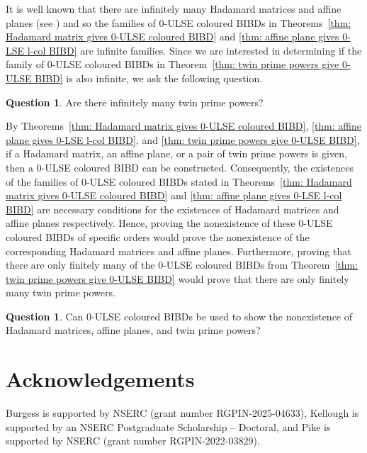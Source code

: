 \documentclass[12pt]{article}
\theoremstyle{definition}
\newtheorem{question}[theorem]{Question}
\begin{document}
It is well known that there are infinitely many Hadamard matrices and affine planes (see \cite{S04}) and so the families of $0$-ULSE coloured BIBDs in Theorems~\ref{thm: Hadamard matrix gives 0-ULSE coloured BIBD} and \ref{thm: affine plane gives 0-LSE l-col BIBD} are infinite families. Since we are interested in determining if the family of $0$-ULSE coloured BIBDs in Theorem~\ref{thm: twin prime powers give 0-ULSE BIBD} is also infinite, we ask the following question. 

\begin{question}
    Are there infinitely many twin prime powers?
\end{question}

By Theorems~\ref{thm: Hadamard matrix gives 0-ULSE coloured BIBD}, \ref{thm: affine plane gives 0-LSE l-col BIBD}, and \ref{thm: twin prime powers give 0-ULSE BIBD}, if a Hadamard matrix, an affine plane, or a pair of twin prime powers is given, then a $0$-ULSE coloured BIBD can be constructed. Consequently, the existences of the families of $0$-ULSE coloured BIBDs stated in Theorems~\ref{thm: Hadamard matrix gives 0-ULSE coloured BIBD} and \ref{thm: affine plane gives 0-LSE l-col BIBD} are necessary conditions for the existences of Hadamard matrices and affine planes respectively. Hence, proving the nonexistence of these $0$-ULSE coloured BIBDs of specific orders would prove the nonexistence of the corresponding Hadamard matrices and affine planes. Furthermore, proving that there are only finitely many of the $0$-ULSE coloured BIBDs from Theorem~\ref{thm: twin prime powers give 0-ULSE BIBD} would prove that there are only finitely many twin prime powers.

\begin{question}
    Can $0$-ULSE coloured BIBDs be used to show the nonexistence of Hadamard matrices, affine planes, and twin prime powers?
\end{question}




\section*{Acknowledgements}

Burgess is supported by NSERC (grant number
RGPIN-2025-04633), Kellough is supported by an NSERC Postgraduate Scholarship – Doctoral, and Pike is supported by NSERC (grant number RGPIN-2022-03829).
\end{document}
